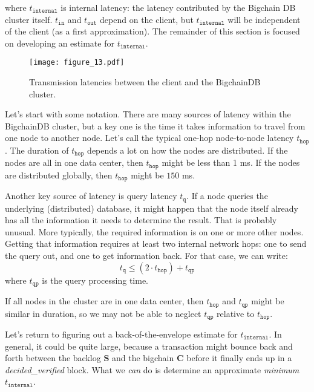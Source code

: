 where $t_{\mathtt{internal}}$ is internal latency: the latency contributed by the Bigchain DB cluster itself. 
$t_{\mathtt{in}}$ and $t_{\mathtt{out}}$ depend on the client, but $t_{\mathtt{internal}}$ will be independent of the client (as a first approximation). 
The remainder of this section is focused on developing an estimate for $t_{\mathtt{internal}}$.

\begin{figure}[!ht]
  \centering
  \texttt{[image: figure\_13.pdf]}
  \caption{Transmission latencies between the client and the BigchainDB cluster.}
  \label{fig:bigchaindb_tx_latency}
\end{figure}

Let’s start with some notation.
There are many sources of latency within the BigchainDB cluster, but a key one is the time it takes information to travel from one node to another node. 
Let’s call the typical one-hop node-to-node latency $t_{\mathtt{hop}}$. The duration of $t_{\mathtt{hop}}$ depends a lot on how the nodes are distributed. 
If the nodes are all in one data center, then $t_{\mathtt{hop}}$ might be less than 1 ms. If the nodes are distributed globally, then $t_{\mathtt{hop}}$ might be $150$ ms.

Another key source of latency is query latency $t_{\mathtt{q}}$. 
If a node queries the underlying (distributed) database, it might happen that the node itself already has all the information it needs to determine the result. 
That is probably unusual. More typically, the required information is on one or more other nodes. 
Getting that information requires at least two internal network hops: one to send the query out, and one to get information back. 
For that case, we can write:
\begin{equation}\label{eq:time_query}
t_\mathtt{q} \le (2 \cdot t_\mathtt{hop}) + t_\mathtt{qp}
\end{equation}
where $t_\mathtt{qp}$ is the query processing time. 

If all nodes in the cluster are in one data center, then $t_\mathtt{hop}$ and $t_\mathtt{qp}$ might be similar in duration, so we may not be able to neglect $t_\mathtt{qp}$ relative to $t_\mathtt{hop}$.

Let’s return to figuring out a back-of-the-envelope estimate for $t_\mathtt{internal}$.
In general, it could be quite large, because a transaction might bounce back and forth between the backlog $\mathbf{S}$ and the bigchain $\mathbf{C}$ before it finally ends up in a \textsf{\textit{decided\_verified}} block.
What we \textit{can} do is determine an approximate \textit{minimum} $t_\mathtt{internal}$.

